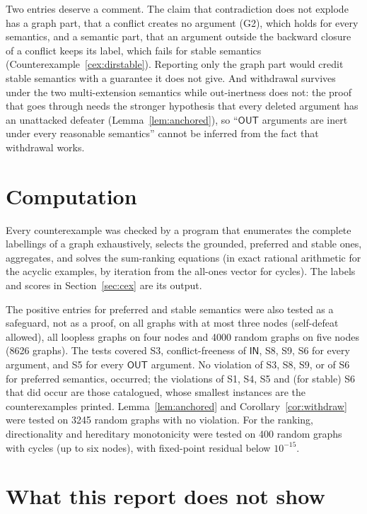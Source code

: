 \documentclass[11pt]{article}
\theoremstyle{plain}
\theoremstyle{definition}
\theoremstyle{remark}
\newcommand{\IN}{\textsf{IN}}
\newcommand{\OUT}{\textsf{OUT}}
\begin{document}
Two entries deserve a comment. The claim that contradiction does not explode has a graph part, that a conflict creates no argument (G2), which holds for every semantics, and a semantic part, that an argument outside the backward closure of a conflict keeps its label, which fails for stable semantics (Counterexample~\ref{cex:dirstable}). Reporting only the graph part would credit stable semantics with a guarantee it does not give. And withdrawal survives under the two multi-extension semantics while out-inertness does not: the proof that goes through needs the stronger hypothesis that every deleted argument has an unattacked defeater (Lemma~\ref{lem:anchored}), so ``$\OUT$ arguments are inert under every reasonable semantics'' cannot be inferred from the fact that withdrawal works.

\section{Computation}\label{sec:comp}

Every counterexample was checked by a program that enumerates the complete labellings of a graph exhaustively, selects the grounded, preferred and stable ones, aggregates, and solves the sum-ranking equations (in exact rational arithmetic for the acyclic examples, by iteration from the all-ones vector for cycles). The labels and scores in Section~\ref{sec:cex} are its output.

The positive entries for preferred and stable semantics were also tested as a safeguard, not as a proof, on all graphs with at most three nodes (self-defeat allowed), all loopless graphs on four nodes and 4000 random graphs on five nodes (8626 graphs). The tests covered S3, conflict-freeness of $\IN$, S8, S9, S6 for every argument, and S5 for every $\OUT$ argument. No violation of S3, S8, S9, or of S6 for preferred semantics, occurred; the violations of S1, S4, S5 and (for stable) S6 that did occur are those catalogued, whose smallest instances are the counterexamples printed. Lemma~\ref{lem:anchored} and Corollary~\ref{cor:withdraw} were tested on 3245 random graphs with no violation. For the ranking, directionality and hereditary monotonicity were tested on 400 random graphs with cycles (up to six nodes), with fixed-point residual below $10^{-15}$.

\section{What this report does not show}\label{sec:limits}
\end{document}
